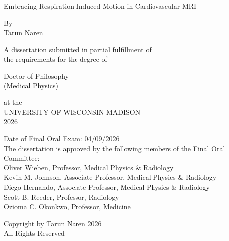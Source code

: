 \begin{titlepage}
    \begin{center}
        \vspace*{1cm}
        
        \normalsize
        Embracing Respiration-Induced Motion in Cardiovascular MRI

        \vfill
        \normalsize
        By\\
    
        Tarun Naren \\
        
        \vfill
        
        A dissertation submitted in partial fulfillment of \\
        the requirements for the degree of\\

        \vfill

        Doctor of Philosophy \\
        (Medical Physics) \\
    
        \vfill
        
        at the \\
        UNIVERSITY OF WISCONSIN-MADISON \\
        2026 \\

        \vfill

        \begin{flushleft}
            \small
            Date of Final Oral Exam:  04/09/2026 \\
            \vspace{0.5cm}
            The dissertation is approved by the following members of the Final Oral Committee: \\
            \setlength{\parindent}{10ex}
            Oliver Wieben, Professor, Medical Physics \& Radiology \\
            Kevin M. Johnson, Associate Professor, Medical Physics \& Radiology \\
            Diego Hernando, Associate Professor, Medical Physics \& Radiology \\
            Scott B. Reeder, Professor, Radiology\\
            Ozioma C. Okonkwo, Professor, Medicine\\
        \end{flushleft}
        
    \end{center}

    \newpage
    \vspace*{\fill}

    \begin{center}
        {\textcopyright{} Copyright by Tarun Naren 2026 \\
    All Rights Reserved} \\
    \end{center}

    \mbox{}

    \newpage
    
\end{titlepage}